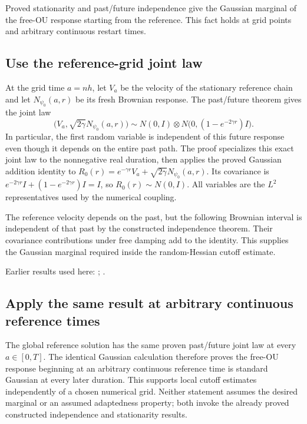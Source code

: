 \documentclass[11pt,a4paper]{report}
\begin{document}
Proved stationarity and past/\allowbreak{}future independence give the Gaussian marginal of the free-OU response starting from the reference. This fact holds at grid points and arbitrary continuous restart times.

\subsection{\texorpdfstring{Use the reference-grid joint law}{Use the reference-grid joint law}}
\label{report-step-KineticLangevin-CanonicalFreeOU-lean-1}


At the grid time \(a=nh\), let \(V_a\) be the velocity of the stationary reference chain and let \(N_{\psi_0}(a,r)\) be its fresh Brownian response. The past/\allowbreak{}future theorem gives the joint law \[\bigl(V_a,\sqrt{2\gamma}N_{\psi_0}(a,r)\bigr)\sim N(0,I)\otimes N\bigl(0,(1-e^{-2\gamma r})I\bigr).\] In particular, the first random variable is independent of this future response even though it depends on the entire past path. The proof specializes this exact joint law to the nonnegative real duration, then applies the proved Gaussian addition identity to \(R_0(r)=e^{-\gamma r}V_a+\sqrt{2\gamma}N_{\psi_0}(a,r)\). Its covariance is \(e^{-2\gamma r}I+(1-e^{-2\gamma r})I=I\), so \(R_0(r)\sim N(0,I)\). All variables are the \(L^{2}\) representatives used by the numerical coupling.



The reference velocity depends on the past, but the following Brownian interval is independent of that past by the constructed independence theorem. Their covariance contributions under free damping add to the identity. This supplies the Gaussian marginal required inside the random-Hessian cutoff estimate.



Earlier results used here: \cite[Section~3.17.1]{LangevinLean2026ULASC}; \cite[Section~3.26.3]{LangevinLean2026ULASC}.
\subsection{\texorpdfstring{Apply the same result at arbitrary continuous reference times}{Apply the same result at arbitrary continuous reference times}}
\label{report-step-KineticLangevin-CanonicalFreeOU-lean-2}


The global reference solution has the same proven past/\allowbreak{}future joint law at every \(a\in[0,T]\). The identical Gaussian calculation therefore proves the free-OU response beginning at an arbitrary continuous reference time is standard Gaussian at every later duration. This supports local cutoff estimates independently of a chosen numerical grid. Neither statement assumes the desired marginal or an assumed adaptedness property; both invoke the already proved constructed independence and stationarity results.
\end{document}
